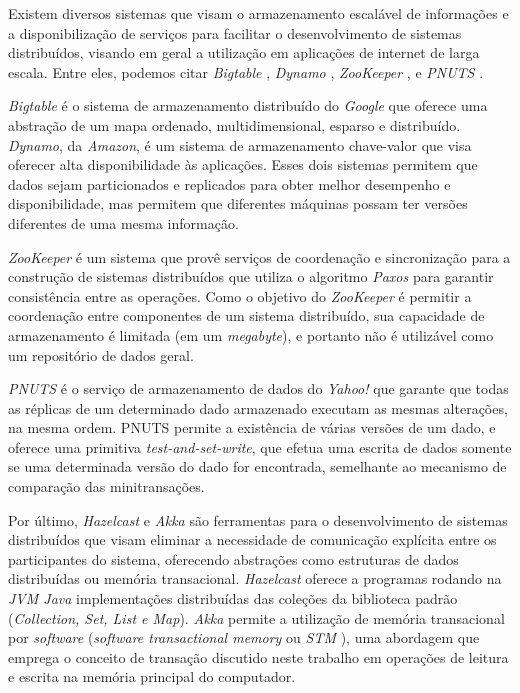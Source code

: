 \documentclass[11pt,twoside,a4paper]{book}
\begin{document}
Existem diversos sistemas que visam o armazenamento escalável de informações e a disponibilização de serviços para facilitar o  desenvolvimento de sistemas distribuídos, visando em geral a utilização em aplicações de internet de larga escala. Entre eles, podemos citar \emph{Bigtable} \cite{bigtable}, \emph{Dynamo} \cite{dynamo}, \emph{ZooKeeper} \cite{zookeeper}, e \emph{PNUTS} \cite{pnuts}.

\emph{Bigtable} é o sistema de armazenamento distribuído do \emph{Google} que oferece uma abstração de um mapa ordenado, multidimensional, esparso e distribuído. \emph{Dynamo}, da \emph{Amazon}, é um sistema de armazenamento chave-valor que visa oferecer alta disponibilidade às aplicações. Esses dois sistemas permitem que dados sejam particionados e replicados para obter melhor desempenho e disponibilidade, mas
permitem que diferentes máquinas possam ter versões diferentes de uma mesma informação.

\emph{ZooKeeper} é um sistema que provê serviços de coordenação e sincronização para a construção de sistemas distribuídos que utiliza o algoritmo \emph{Paxos} \cite{paxos} para garantir consistência entre as operações. Como o objetivo do \emph{ZooKeeper} é permitir a coordenação entre componentes de um sistema distribuído, sua capacidade de armazenamento é limitada (em um \emph{megabyte}), e portanto não é utilizável como um repositório de dados geral.

\emph{PNUTS} é o serviço de armazenamento de dados do \emph{Yahoo!} que garante que todas as réplicas de um determinado dado armazenado executam as mesmas alterações, na mesma ordem. PNUTS permite a existência de várias versões de um dado, e oferece uma primitiva \emph{test-and-set-write}, que efetua uma escrita de dados somente se uma determinada versão do dado for encontrada, semelhante ao mecanismo de comparação das minitransações.

Por último, \emph{Hazelcast} \cite{hazelcast} e \emph{Akka} \cite{akka} são ferramentas para o desenvolvimento de sistemas distribuídos que visam eliminar a necessidade de comunicação explícita entre os participantes do sistema, oferecendo abstrações como estruturas de dados
distribuídas ou memória transacional. \emph{Hazelcast} oferece a programas rodando na \emph{JVM Java} implementações distribuídas das coleções da biblioteca padrão (\emph{Collection, Set, List e Map}). \emph{Akka} permite a utilização de memória transacional por \emph{software} (\emph{software transactional memory} ou \emph{STM} \cite{stm}), uma abordagem que emprega o conceito de transação discutido 
neste trabalho em operações de leitura e escrita na memória principal do computador.
\end{document}
